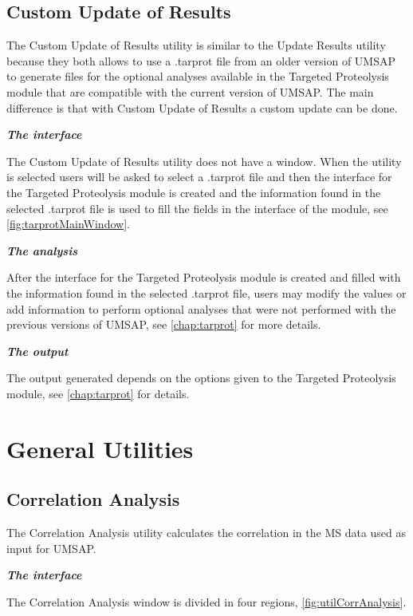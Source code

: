 \subsection{Custom Update of Results }
\label{subsec:utilReanalyzeTarprot}

The Custom Update of Results utility is similar to the Update Results utility because they both allows to use  a .tarprot file from an older version of UMSAP to generate files for the optional analyses available in the Targeted Proteolysis module that are compatible with the current version of UMSAP. The main difference is that with Custom Update of Results a custom update can be done.

\textit{\textbf{The interface}}

The Custom Update of Results utility does not have a window. When the utility is selected users will be asked to select a .tarprot file and then the interface for the Targeted Proteolysis module is created and the information found in the selected .tarprot file is used to fill the fields in the interface of the module, see \autoref{fig:tarprotMainWindow}.

\textit{\textbf{The analysis}}

After the interface for the Targeted Proteolysis module is created and filled with the information found in the selected .tarprot file, users may modify the values or add information to perform optional analyses that were not performed with the previous versions of UMSAP, see \autoref{chap:tarprot} for more details.

\textit{\textbf{The output}}    

The output generated depends on the options given to the Targeted Proteolysis module, see \autoref{chap:tarprot} for details.

\section{General Utilities}

\subsection{Correlation Analysis}

The Correlation Analysis utility calculates the correlation in the MS data used as input for UMSAP.

\textit{\textbf{The interface}}

The Correlation Analysis window is divided in four regions, \autoref{fig:utilCorrAnalysis}. 

